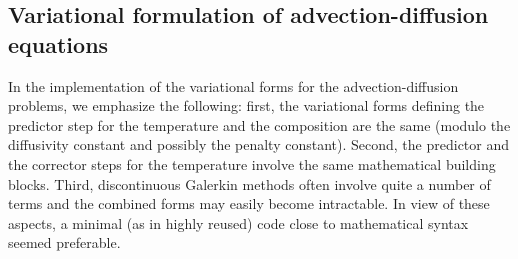 \subsection{Variational formulation of advection-diffusion equations}

In the implementation of the variational forms for the
advection-diffusion problems, we emphasize the following:
first, the variational forms defining the predictor step for
the temperature and the composition are the same (modulo the
diffusivity constant and possibly the penalty constant).  Second, the
predictor and the corrector steps for the temperature involve the same
mathematical building blocks. Third, discontinuous Galerkin methods
often involve quite a number of terms and the combined forms may
easily become intractable. In view of these aspects, a minimal (as in
highly reused) code close to mathematical syntax seemed preferable.

